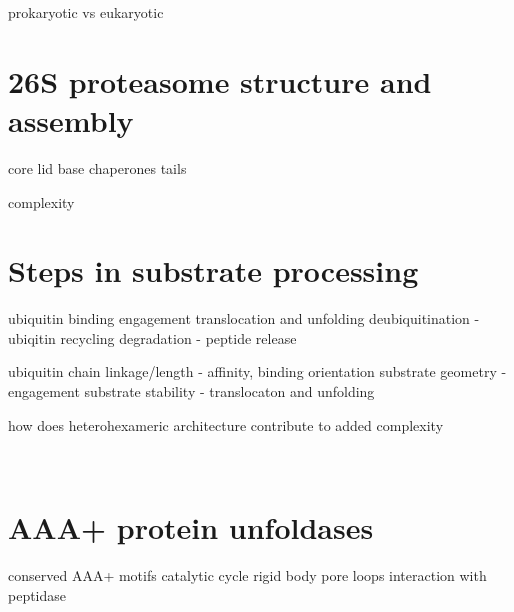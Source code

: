 prokaryotic vs eukaryotic

\section{26S proteasome structure and assembly}

core
lid
base
chaperones
tails

complexity

\section{Steps in substrate processing}
ubiquitin binding
engagement
translocation and unfolding
deubiquitination - ubiqitin recycling
degradation - peptide release

ubiquitin chain linkage/length - affinity, binding orientation
substrate geometry - engagement
substrate stability - translocaton and unfolding 

how does heterohexameric architecture contribute to added complexity


\

\section{AAA+ protein unfoldases}

conserved AAA+ motifs
catalytic cycle
rigid body
pore loops
interaction with peptidase

